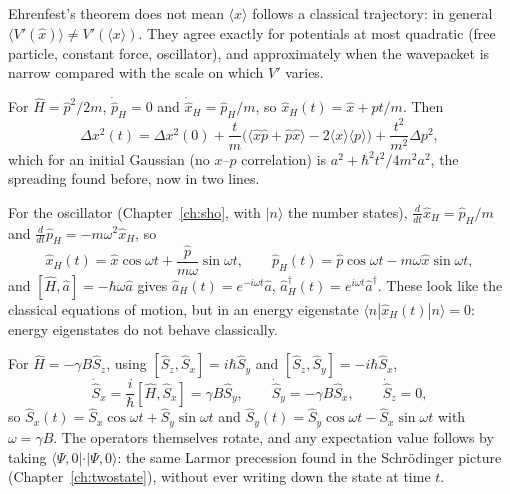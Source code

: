Ehrenfest's theorem does not mean $\langle x\rangle$ follows a classical trajectory: in general $\langle V'(\hat{x})\rangle\neq V'(\langle x\rangle)$. They agree exactly for potentials at most quadratic (free particle, constant force, oscillator), and approximately when the wavepacket is narrow compared with the scale on which $V'$ varies.

\begin{example}
For $\hat{H} = \hat{p}^2/2m$, $\dot{\hat{p}}_H = 0$ and $\dot{\hat{x}}_H = \hat{p}_H/m$, so $\hat{x}_H(t) = \hat{x} + \hat{p}t/m$. Then
\[
    \Delta x^2(t) = \Delta x^2(0) + \frac{t}{m}\bigl(\langle\hat{x}\hat{p}+\hat{p}\hat{x}\rangle - 2\langle x\rangle\langle p\rangle\bigr) + \frac{t^2}{m^2}\Delta p^2,
\]
which for an initial Gaussian (no $x$--$p$ correlation) is $a^2 + \hbar^2t^2/4m^2a^2$, the spreading found before, now in two lines.
\end{example}

\begin{example}
For the oscillator (Chapter~\ref{ch:sho}, with $|n\rangle$ the number states), $\frac{d}{dt}\hat{x}_H = \hat{p}_H/m$ and $\frac{d}{dt}\hat{p}_H = -m\omega^2\hat{x}_H$, so
\[
    \hat{x}_H(t) = \hat{x}\cos\omega t + \frac{\hat{p}}{m\omega}\sin\omega t,
    \qquad
    \hat{p}_H(t) = \hat{p}\cos\omega t - m\omega\hat{x}\sin\omega t,
\]
and $[\hat{H},\hat{a}] = -\hbar\omega\hat{a}$ gives $\hat{a}_H(t) = e^{-i\omega t}\hat{a}$, $\hat{a}^\dagger_H(t) = e^{i\omega t}\hat{a}^\dagger$. These look like the classical equations of motion, but in an energy eigenstate $\langle n|\hat{x}_H(t)|n\rangle = 0$: energy eigenstates do not behave classically.
\end{example}

\begin{example}
For $\hat{H} = -\gamma B\hat{S}_z$, using $[\hat{S}_z,\hat{S}_x] = i\hbar\hat{S}_y$ and $[\hat{S}_z,\hat{S}_y] = -i\hbar\hat{S}_x$,
\[
    \dot{\hat{S}}_x = \frac{i}{\hbar}[\hat{H},\hat{S}_x] = \gamma B\hat{S}_y,
    \qquad
    \dot{\hat{S}}_y = -\gamma B\hat{S}_x,
    \qquad
    \dot{\hat{S}}_z = 0,
\]
so $\hat{S}_x(t) = \hat{S}_x\cos\omega t + \hat{S}_y\sin\omega t$ and $\hat{S}_y(t) = \hat{S}_y\cos\omega t - \hat{S}_x\sin\omega t$ with $\omega = \gamma B$. The operators themselves rotate, and any expectation value follows by taking $\langle\Psi,0|\cdot|\Psi,0\rangle$: the same Larmor precession found in the Schr\"odinger picture (Chapter~\ref{ch:twostate}), without ever writing down the state at time $t$.
\end{example}

